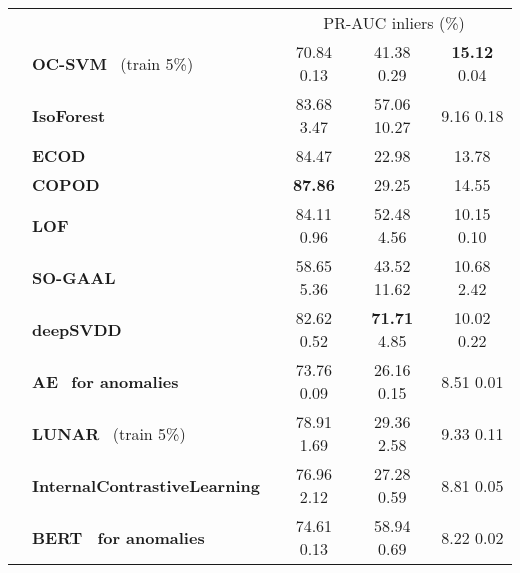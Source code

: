 \documentclass{article}
\begin{document}
\begin{table}[t]
\begin{center}
\begin{tabular}{c l c c c}
    && \multicolumn{3}{c}{PR-AUC inliers (\%) } \\
    \cmidrule(lr){3-5}
    \parbox[t]{2mm}{}
    & \textbf{OC-SVM}~\cite{ocsvm} (train 5\%) & 70.84  \small 0.13 & 41.38  \small 0.29 & \textbf{15.12}  \small 0.04\\ 
    & \textbf{IsoForest}~\cite{isoforest} & 83.68  \small 3.47 & 57.06  \small 10.27 & 9.16  \small 0.18 \\ 
    & \textbf{ECOD}~\cite{ecod} & 84.47 & 22.98 & 13.78\\ 
    & \textbf{COPOD}~\cite{copod} & \textbf{87.86}  & 29.25 & 14.55 \\ 
    & \textbf{LOF}~\cite{lof} & 84.11  \small 0.96 & 52.48  \small 4.56 & 10.15  \small 0.10 \\ 
    \cmidrule(lr){2-5}
    \parbox[t]{2mm}{} 
    & \textbf{SO-GAAL}~\cite{mo_gaal} & 58.65  \small 5.36 & 43.52  \small 11.62 & 10.68  \small 2.42\\ 
    & \textbf{deepSVDD}~\cite{deepsvdd} & 82.62  \small 0.52 & \textbf{71.71}  \small 4.85 & 10.02  \small 0.22 \\
& \textbf{AE}~\cite{autoencoder} \textbf{for anomalies} & 73.76  \small 0.09 & 26.16  \small 0.15 & 8.51  \small 0.01\\
    & \textbf{LUNAR}~\cite{lunar} (train 5\%) & 78.91  \small 1.69 & 29.36  \small 2.58 & 9.33  \small 0.11\\ 
    & \textbf{InternalContrastiveLearning}~\cite{icl} & 76.96  \small 2.12 & 27.28   \small 0.59 & 8.81  \small 0.05\\ 
    & \textbf{BERT~\cite{bert} for anomalies} & 74.61  \small 0.13 & 58.94  \small 0.69 & 8.22  \small 0.02 \\ 
    
    
    \midrule
    

\end{tabular}
\end{center}
\end{table}
\end{document}
